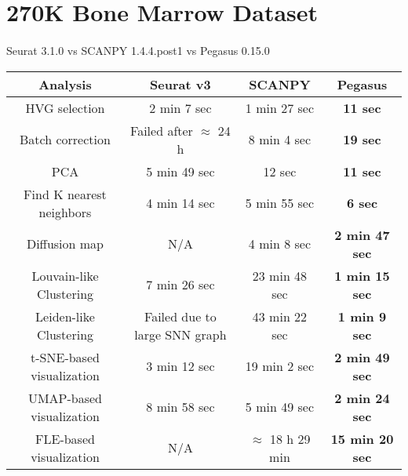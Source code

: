 \documentclass[10pt]{article}
\begin{document}
\section{270K Bone Marrow Dataset}

\paragraph{}
Seurat 3.1.0 \qquad vs \qquad SCANPY 1.4.4.post1 \qquad vs \qquad Pegasus 0.15.0

\begin{table}[H]
	\centering
	\begin{tabular}{|c|c|c|c|}
		\hline
		Analysis & Seurat v3 & SCANPY & Pegasus\\
		\hline \hline
		HVG selection & 2 min 7 sec & 1 min 27 sec & \textbf{11 sec} \\
		\hline
		Batch correction & Failed after $\approx$ 24 h & 8 min 4 sec & \textbf{19 sec} \\
		\hline
		PCA & 5 min 49 sec & 12 sec & \textbf{11 sec} \\
		\hline
		Find K nearest neighbors &  4 min 14 sec &  5 min 55 sec & \textbf{6 sec}\\
		\hline
		Diffusion map & N/A & 4 min 8 sec & \textbf{2 min 47 sec} \\
		\hline
		Louvain-like Clustering & 7 min 26 sec & 23 min 48 sec & \textbf{1 min 15 sec} \\
		\hline 
		Leiden-like Clustering & Failed due to large SNN graph & 43 min 22 sec & \textbf{1 min 9 sec}\\
		\hline
		t-SNE-based visualization & 3 min 12 sec & 19 min 2 sec & \textbf{2 min 49 sec}\\
		\hline
		UMAP-based visualization & 8 min 58 sec & 5 min 49 sec  & \textbf{2 min 24 sec}\\
		\hline
		FLE-based visualization & N/A & $\approx$ 18 h 29 min & \textbf{15 min 20 sec}\\
		\hline
	\end{tabular}
\end{table}
\end{document}
